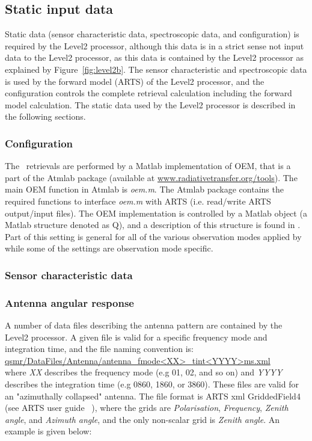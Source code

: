 \subsection{Static input data}
\label{sec:static}
Static data (sensor characteristic data, spectroscopic data, and configuration)
is required by the Level2 processor, although this data is in a strict
sense not input data to the Level2 processor, as this data
is contained by the Level2 processor as explained by Figure~\ref{fig:level2b}.
The sensor characteristic and spectroscopic data
is used by the forward model (ARTS) of the Level2 processor,
and the configuration controls the complete retrieval
calculation including the forward model calculation.  
The static data used by the Level2 processor is 
described in the following sections.
 

\subsubsection{Configuration}

The \smr\ retrievals are performed by a Matlab implementation of OEM,
that is a part of the Atmlab package (available at \url{www.radiativetransfer.org/tools}).
The main OEM function in Atmlab is \emph{oem.m}. 
The Atmlab package contains the required functions to interface \emph{oem.m} with ARTS
(i.e. read/write ARTS output/input files).
The OEM implementation is controlled by a Matlab object
(a Matlab structure denoted as Q), and  
a description of this structure is found in \cite{l2conf}.
Part of this setting is general for all of the various 
observation modes applied by \smr\, while some of the settings
are observation mode specific.

\subsubsection{Sensor characteristic data}

\subsubsection*{Antenna angular response}

A number of data files describing the antenna pattern
are contained by the Level2 processor.
A given file is valid for a specific frequency mode and integration
time, and the file naming convention is:\\
\url{qsmr/DataFiles/Antenna/antenna_fmode<XX>_tint<YYYY>ms.xml}\\
where \emph{XX} describes the frequency mode (e.g 01, 02, and so on)
and \emph{YYYY} describes the integration time (e.g 0860, 1860, or 3860).
These files are valid for an "azimuthally collapsed"
antenna. The file format is ARTS xml GriddedField4 (see ARTS user guide ~\citep{artsug}),
where the grids are \emph{Polarisation}, \emph{Frequency}, \emph{Zenith angle},
and \emph{Azimuth angle}, and the only non-scalar grid is \emph{Zenith angle}.
An example is given below:

